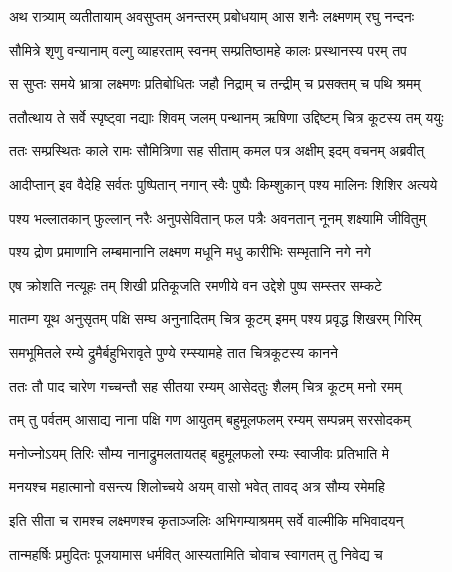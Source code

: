 
\twolineshloka
{अथ रात्र्याम् व्यतीतायाम् अवसुप्तम् अनन्तरम्}
{प्रबोधयाम् आस शनैः लक्ष्मणम् रघु नन्दनः} %

\twolineshloka
{सौमित्रे शृणु वन्यानाम् वल्गु व्याहरताम् स्वनम्}
{सम्प्रतिष्ठामहे कालः प्रस्थानस्य परम् तप} %

\twolineshloka
{स सुप्तः समये भ्रात्रा लक्ष्मणः प्रतिबोधितः}
{जहौ निद्राम् च तन्द्रीम् च प्रसक्तम् च पथि श्रमम्} %

\twolineshloka
{ततौत्थाय ते सर्वे स्पृष्ट्वा नद्याः शिवम् जलम्}
{पन्थानम् ऋषिणा उद्दिष्टम् चित्र कूटस्य तम् ययुः} %

\twolineshloka
{ततः सम्प्रस्थितः काले रामः सौमित्रिणा सह}
{सीताम् कमल पत्र अक्षीम् इदम् वचनम् अब्रवीत्} %

\twolineshloka
{आदीप्तान् इव वैदेहि सर्वतः पुष्पितान् नगान्}
{स्वैः पुष्पैः किम्शुकान् पश्य मालिनः शिशिर अत्यये} %

\twolineshloka
{पश्य भल्लातकान् फुल्लान् नरैः अनुपसेवितान्}
{फल पत्रैः अवनतान् नूनम् शक्ष्यामि जीवितुम्} %

\twolineshloka
{पश्य द्रोण प्रमाणानि लम्बमानानि लक्ष्मण}
{मधूनि मधु कारीभिः सम्भृतानि नगे नगे} %

\twolineshloka
{एष क्रोशति नत्यूहः तम् शिखी प्रतिकूजति}
{रमणीये वन उद्देशे पुष्प सम्स्तर सम्कटे} %

\twolineshloka
{मातम्ग यूथ अनुसृतम् पक्षि सम्घ अनुनादितम्}
{चित्र कूटम् इमम् पश्य प्रवृद्ध शिखरम् गिरिम्} %

\twolineshloka
{समभूमितले रम्ये द्रुमैर्बहुभिरावृते}
{पुण्ये रम्स्यामहे तात चित्रकूटस्य कानने} %

\twolineshloka
{ततः तौ पाद चारेण गच्चन्तौ सह सीतया}
{रम्यम् आसेदतुः शैलम् चित्र कूटम् मनो रमम्} %

\twolineshloka
{तम् तु पर्वतम् आसाद्य नाना पक्षि गण आयुतम्}
{बहुमूलफलम् रम्यम् सम्पन्नम् सरसोदकम्} %

\twolineshloka
{मनोज्नोऽयम् तिरिः सौम्य नानाद्रुमलतायतह्}
{बहुमूलफलो रम्यः स्वाजीवः प्रतिभाति मे} %

\twolineshloka
{मनयश्च महात्मानो वसन्त्य शिलोच्चये}
{अयम् वासो भवेत् तावद् अत्र सौम्य रमेमहि} %

\twolineshloka
{इति सीता च रामश्च लक्ष्मणश्च कृताञ्जलिः}
{अभिगम्याश्रमम् सर्वे वाल्मीकि मभिवादयन्} %

\twolineshloka
{तान्महर्षिः प्रमुदितः पूजयामास धर्मवित्}
{आस्यतामिति चोवाच स्वागतम् तु निवेद्य च} %

